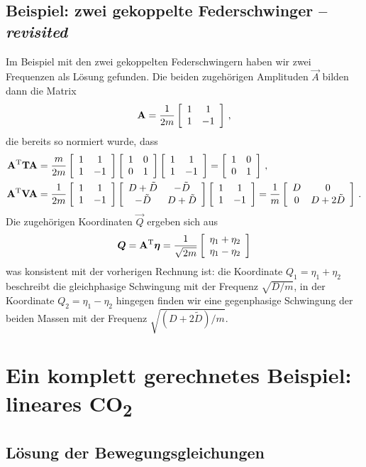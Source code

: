 \documentclass[paper=a4, fontsize=11.0pt, abstractoff, DIV12]{scrartcl}
\begin{document}
\subsection*{Beispiel: zwei gekoppelte Federschwinger -- \emph{revisited}}

Im Beispiel mit den zwei gekoppelten Federschwingern haben wir zwei Frequenzen
als Lösung gefunden. Die beiden zugehörigen Amplituden $\vec A$ bilden dann die
Matrix
\begin{equation}
\mathbf{A} = \frac{1}{2m}\left[ \begin{array}{cc} 1 & 1 \\ 1 & -1 \end{array} \right]\, ,
\end{equation}
die bereits so normiert wurde, dass
\begin{align}
\mathbf{A}^\mathrm{T}\mathbf{T}\mathbf{A} &= \frac{m}{2m}\left[ \begin{array}{cc} 1 & 1 \\ 1 & -1 \end{array} \right]\left[ \begin{array}{cc} 1 & 0 \\ 0 & 1 \end{array} \right]\left[ \begin{array}{cc} 1 & 1 \\ 1 & -1 \end{array} \right] = \left[ \begin{array}{cc} 1 & 0 \\ 0 & 1 \end{array} \right]\, ,\\
\mathbf{A}^\mathrm{T}\mathbf{V}\mathbf{A} &= \frac{1}{2m}\left[ \begin{array}{cc} 1 & 1 \\ 1 & -1 \end{array} \right]\left[ \begin{array}{cc} D+\tilde D & -\tilde D \\ -\tilde D & D+\tilde D \end{array} \right]\left[ \begin{array}{cc} 1 & 1 \\ 1 & -1 \end{array} \right] = \frac{1}{m}\left[ \begin{array}{cc} D & 0 \\ 0 & D+2\tilde D \end{array} \right]\, .
\end{align}
Die zugehörigen Koordinaten $\vec Q$ ergeben sich aus
\begin{align}
{\ensuremath{\boldsymbol{Q}}} = \mathbf{A}^\mathrm{T} {\boldsymbol{\eta}} = \frac{1}{\sqrt{2m}}\left[ \begin{array}{c} \eta_1 + \eta_2 \\ \eta_1-\eta_2 \end{array} \right]
\end{align}
was konsistent mit der vorherigen Rechnung ist: die Koordinate $Q_1 = \eta_1 + \eta_2$
beschreibt die gleichphasige Schwingung mit der Frequenz $\sqrt{D/m}$, in der
Koordinate $Q_2 = \eta_1 - \eta_2$ hingegen finden wir eine gegenphasige
Schwingung der beiden Massen mit der Frequenz $\sqrt{(D+2\tilde D)/m}$.

\section{Ein komplett gerechnetes Beispiel: lineares CO\textsubscript{2}}

\subsection{Lösung der Bewegungsgleichungen}
\end{document}
